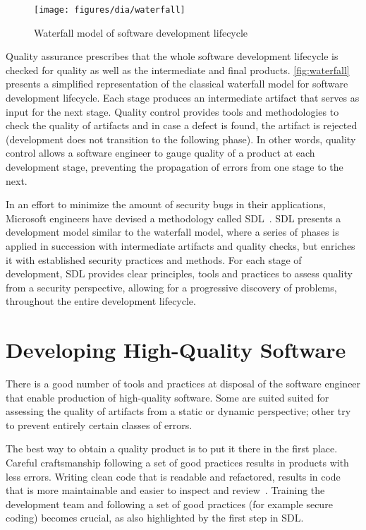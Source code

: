 \begin{figure}[h]
    \centering
    \texttt{[image: figures/dia/waterfall]}
    \caption{Waterfall model of software development lifecycle}
    \label{fig:waterfall}
\end{figure}

Quality assurance prescribes that the whole software development lifecycle is
checked for quality as well as the intermediate and final products.
\autoref{fig:waterfall} presents a simplified representation of the classical
waterfall model for software development lifecycle. Each stage produces an
intermediate artifact that serves as input for the next stage. Quality control
provides tools and methodologies to check the quality of artifacts and in case a
defect is found, the artifact is rejected (development does not transition to
the following phase). In other words, quality control allows a software engineer
to gauge quality of a product at each development stage, preventing the
propagation of errors from one stage to the next.

In an effort to minimize the amount of security bugs in their applications,
Microsoft engineers have devised a methodology called
\ac{SDL}~\cite{lipner2004trustworthy}. \ac{SDL} presents a development model
similar to the waterfall model, where a series of phases is applied in
succession with intermediate artifacts and quality checks, but enriches it with
established security practices and methods. For each stage of development,
\ac{SDL} provides clear principles, tools and practices to assess quality from a
security perspective, allowing for a progressive discovery of problems,
throughout the entire development lifecycle.

\section{Developing High-Quality Software}
\label{sec:dev-hq-sw}
There is a good number of tools and practices at disposal of the software
engineer that enable production of high-quality software. Some are suited suited
for assessing the quality of artifacts from a static or dynamic perspective;
other try to prevent entirely certain classes of errors.

The best way to obtain a quality product is to put it there in the first place.
Careful craftsmanship following a set of good practices results in products with
less errors. Writing clean code that is readable and refactored, results in code
that is more maintainable and easier to inspect and
review~\cite{martin2009clean,fowler1999refactoring}. Training the development
team and following a set of good practices (for example secure coding) becomes
crucial, as also highlighted by the first step in \ac{SDL}.


